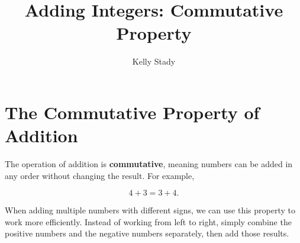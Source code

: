 \documentclass{ximera}[font=12pt]
\title{Adding Integers: Commutative Property}   %
\author{Kelly Stady}
\begin{document}
\begin{abstract}

\end{abstract}

\maketitle
\label{xim:AddIntCommPropActivity}


\section*{The Commutative Property of Addition}

The operation of addition is \textbf{commutative}, meaning numbers can be added in any order without changing 
the result.  For example,

\[ 4 + 3 = 3 + 4. \]

When adding multiple numbers with different signs, we can use this property to work more efficiently.  Instead of 
working from left to right, simply combine the positive numbers and the negative numbers separately, then add 
those results.
\end{document}
